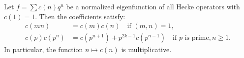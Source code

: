 Let $f = \sum c(n)q^n$ be a normalized eigenfunction of all Hecke operators with $c(1) = 1$. Then the coefficients satisfy:
\begin{align*}
c(mn) &= c(m)c(n) \quad \text{if } (m, n) = 1,\\
c(p)c(p^n) &= c(p^{n+1}) + p^{2k-1}c(p^{n-1}) \quad \text{if } p \text{ is prime}, n \geq 1.
\end{align*}
In particular, the function $n \mapsto c(n)$ is multiplicative.
